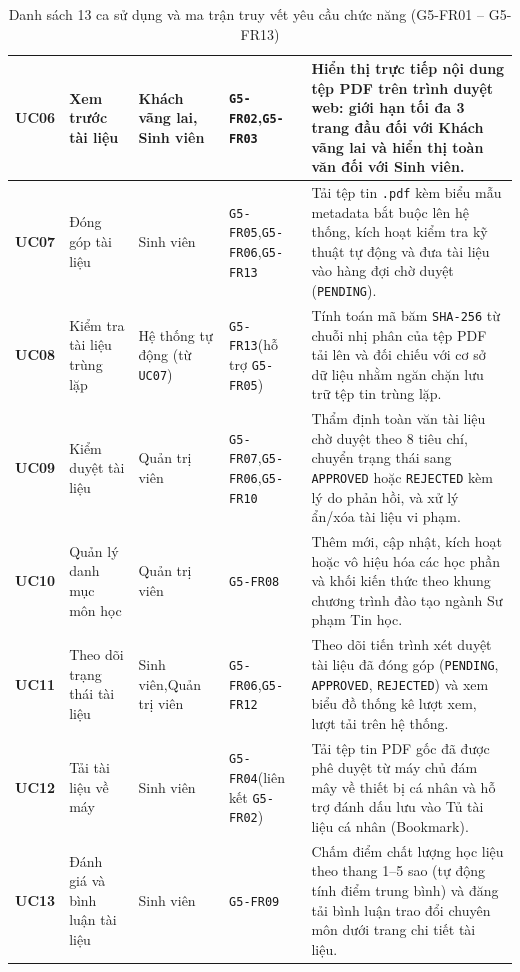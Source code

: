 \begin{table}[H]
\begin{tabularx}{\textwidth}{|c|p{3.0cm}|p{2.5cm}|p{2.2cm}|X|}
\hline
\textbf{UC06} & Xem trước tài liệu & Khách vãng lai, Sinh viên & \texttt{G5-FR02},\newline\texttt{G5-FR03} & Hiển thị trực tiếp nội dung tệp PDF trên trình duyệt web: giới hạn tối đa 3 trang đầu đối với Khách vãng lai và hiển thị toàn văn đối với Sinh viên. \\
\hline
\textbf{UC07} & Đóng góp tài liệu & Sinh viên & \texttt{G5-FR05},\newline\texttt{G5-FR06},\newline\texttt{G5-FR13} & Tải tệp tin \texttt{.pdf} kèm biểu mẫu metadata bắt buộc lên hệ thống, kích hoạt kiểm tra kỹ thuật tự động và đưa tài liệu vào hàng đợi chờ duyệt (\texttt{PENDING}). \\
\hline
\textbf{UC08} & Kiểm tra tài liệu trùng lặp & Hệ thống tự động (từ \texttt{UC07}) & \texttt{G5-FR13}\newline(hỗ trợ \texttt{G5-FR05}) & Tính toán mã băm \texttt{SHA-256} từ chuỗi nhị phân của tệp PDF tải lên và đối chiếu với cơ sở dữ liệu nhằm ngăn chặn lưu trữ tệp tin trùng lặp. \\
\hline
\textbf{UC09} & Kiểm duyệt tài liệu & Quản trị viên & \texttt{G5-FR07},\newline\texttt{G5-FR06},\newline\texttt{G5-FR10} & Thẩm định toàn văn tài liệu chờ duyệt theo 8 tiêu chí, chuyển trạng thái sang \texttt{APPROVED} hoặc \texttt{REJECTED} kèm lý do phản hồi, và xử lý ẩn/xóa tài liệu vi phạm. \\
\hline
\textbf{UC10} & Quản lý danh mục môn học & Quản trị viên & \texttt{G5-FR08} & Thêm mới, cập nhật, kích hoạt hoặc vô hiệu hóa các học phần và khối kiến thức theo khung chương trình đào tạo ngành Sư phạm Tin học. \\
\hline
\textbf{UC11} & Theo dõi trạng thái tài liệu & Sinh viên,\newline Quản trị viên & \texttt{G5-FR06},\newline\texttt{G5-FR12} & Theo dõi tiến trình xét duyệt tài liệu đã đóng góp (\texttt{PENDING}, \texttt{APPROVED}, \texttt{REJECTED}) và xem biểu đồ thống kê lượt xem, lượt tải trên hệ thống. \\
\hline
\textbf{UC12} & Tải tài liệu về máy & Sinh viên & \texttt{G5-FR04}\newline(liên kết \texttt{G5-FR02}) & Tải tệp tin PDF gốc đã được phê duyệt từ máy chủ đám mây về thiết bị cá nhân và hỗ trợ đánh dấu lưu vào Tủ tài liệu cá nhân (Bookmark). \\
\hline
\textbf{UC13} & Đánh giá và bình luận tài liệu & Sinh viên & \texttt{G5-FR09} & Chấm điểm chất lượng học liệu theo thang 1--5 sao (tự động tính điểm trung bình) và đăng tải bình luận trao đổi chuyên môn dưới trang chi tiết tài liệu. \\
\hline
\end{tabularx}
\caption{Danh sách 13 ca sử dụng và ma trận truy vết yêu cầu chức năng (G5-FR01 -- G5-FR13)}
\label{tab:uc_traceability}
\end{table}


